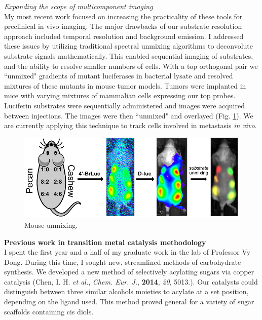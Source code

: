 \documentclass[11pt]{article}
\begin{document}
\textit{Expanding the scope of multicomponent imaging}\\
My most recent work focused on increasing the practicality of these tools for preclinical in vivo imaging. The major drawbacks of our substrate resolution approach included temporal resolution and background emission. I addressed these issues by utilizing traditional spectral unmixing algorithms to deconvolute substrate signals mathematically. This enabled sequential imaging of substrates, and the ability to resolve smaller numbers of cells. With a top orthogonal pair we ``unmixed" gradients of mutant luciferases in bacterial lysate and resolved mixtures of these mutants in mouse tumor models. Tumors were implanted in mice with varying mixtures of mammalian cells expressing our top probes. Luciferin substrates were sequentially administered and images were acquired between injections. The images were then ``unmixed" and overlayed (Fig. \ref{figure:mouse_unmixing}). We are currently applying this technique to track cells involved in metastasis \textit{in vivo}. %

\begin{figure}
\begin{centering}
\includegraphics[width=\textwidth]{figures/mouse_unmixing.pdf}

\end{centering}
\footnotesize
\caption{\label{figure:mouse_unmixing}
Mouse unmixing. %
}
\end{figure}

\textbf{Previous work in transition metal catalysis methodology}\\ %
I spent the first year and a half of my graduate work in the lab of Professor Vy Dong. During this time, I sought new, streamlined methods of carbohydrate synthesis. We developed a new method of selectively acylating sugars via copper catalysis (Chen, I. H. \textit{et al.}, \textit{Chem. Eur. J.}, \textbf{2014}, \textit{20}, 5013.). Our catalysts could distinguish between three similar alcohols moieties to acylate at a set position, depending on the ligand used. This method proved general for a variety of sugar scaffolds containing cis diols.
\end{document}
